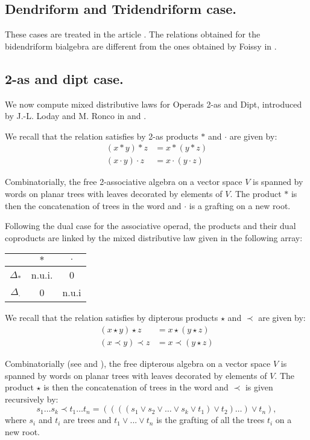 \documentclass[11pt,leqno]{amsart}
\theoremstyle{definition}
\theoremstyle{plain}
\begin{document}
\subsection{Dendriform and Tridendriform case.}

These cases are treated in the article \cite{DendTridend}. The relations obtained for the bidendriform bialgebra are different from the ones obtained by Foissy in \cite{Foissy}.

\subsection{2-as and dipt case.}

We now compute mixed distributive laws for Operads 2-as and Dipt, introduced by J.-L. Loday and M. Ronco in \cite{nui} and \cite{dipt}.

We recall that the relation satisfies by 2-as products $\ast$ and $\cdot$ are given by: 
\begin{align*}
(x \ast y) \ast z &= x \ast (y \ast z) \\
(x \cdot y) \cdot z&= x \cdot (y \cdot z)
\end{align*}

Combinatorially, the free 2-associative algebra on a vector space $V$ is spanned by words on planar trees with leaves decorated by elements of $V$. The product $ \ast$ is then the concatenation of trees in the word and $\cdot$ is a grafting on a new root.

Following the dual case for the associative operad, the products and their dual coproducts are linked by the mixed distributive law given in the following array:
\begin{center}
\begin{tabular}{|c|c|c|}
\hline
& $\ast$ & $\cdot$ \\\hline
$\Delta_\ast$ & n.u.i. & 0 \\ \hline
$\Delta_{\cdot}$ & 0 & n.u.i \\ \hline
\end{tabular}
\end{center}

We recall that the relation satisfies by dipterous products $\star$ and $\prec$ are given by: 
\begin{align*}
(x \star y) \star z &= x \star (y \star z) \\
(x \prec y) \prec z&= x \prec (y \star z)
\end{align*}

Combinatorially (see \cite{nui} and \cite{dipt}), the free dipterous algebra on a vector space $V$ is spanned by words on planar trees with leaves decorated by elements of $V$. The product $ \star$ is then the concatenation of trees in the word and $\prec$ is given recursively by:
\begin{equation*}
s_1 \ldots s_k \prec t_1 \ldots t_n = \left((((s_1 \vee s_2 \vee \ldots \vee s_k \vee t_1) \vee t_2 ) \ldots )\vee t_n \right),
\end{equation*}
where $s_i$ and $t_i$ are trees and $t_1 \vee ... \vee t_n $ is the grafting of all the trees $t_i$ on a new root.
\end{document}
